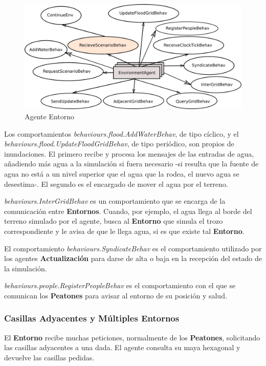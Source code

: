 \begin{figure}[H]
 \centering
 \includegraphics[width=130mm]{figuras/cap5/ag_environment.png}
 \caption{Agente Entorno}
\end{figure}

Los comportamientos {\em behaviours.flood.AddWaterBehav}, de tipo cíclico, y el
{\em behaviours.flood.UpdateFloodGridBehav}, de tipo periódico, son propios de
inundaciones. El primero recibe y procesa los mensajes de las entradas de agua,
añadiendo más agua a la simulación si fuera necesario -si resulta que la fuente
de agua no está a un nivel superior que el agua que la rodea, el nuevo agua se
desestima-. El segundo es el encargado de mover el agua por el terreno.

{\em behaviours.InterGridBehav} es un comportamiento que se encarga de la
comunicación entre {\bf Entornos}. Cuando, por ejemplo, el agua llega al borde
del terreno simulado por el agente, busca al {\bf Entorno} que simula el trozo
correspondiente y le avisa de que le llega agua, si es que existe tal {\bf
Entorno}.

El comportamiento {\em behaviours.SyndicateBehav} es el comportamiento
utilizado por los agentes {\bf Actualización} para darse de alta o baja en la
recepción del estado de la simulación.

{\em behaviours.people.RegisterPeopleBehav} es el comportamiento con el que se
comunican los {\bf Peatones} para avisar al entorno de su posición y salud.


\subsubsection*{Casillas Adyacentes y Múltiples Entornos}

El {\bf Entorno} recibe muchas peticiones, normalmente de los {\bf Peatones},
solicitando las casillas adyacentes a una dada. El agente consulta su maya
hexagonal y devuelve las casillas pedidas.

